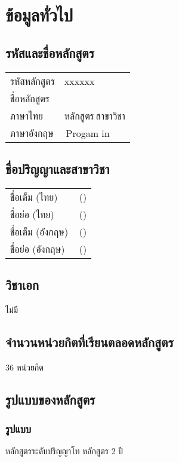 \cleardoublepage
\setcounter{page}{1}
\pagestyle{headings}
\chapter{ข้อมูลทั่วไป}

\section{รหัสและชื่อหลักสูตร}

\begin{tabular}{p{}p{}}
	รหัสหลักสูตร & xxxxxx\\
	ชื่อหลักสูตร & \\
	ภาษาไทย & หลักสูตร\thdegree\,สาขาวิชา\thdegreebranch \\
	ภาษาอังกฤษ & \engdegree\,Progam in \engdegreebranch
\end{tabular}

\section{ชื่อปริญญาและสาขาวิชา}

\begin{tabular}{p{}p{}}
	ชื่อเต็ม (ไทย) & \thdegree\,(\thdegreebranch)\\
	ชื่อย่อ (ไทย) & \thshortdegree\,(\thdegreebranch)\\
	ชื่อเต็ม (อังกฤษ) & \engdegree\,(\engdegreebranch)\\
	ชื่อย่อ (อังกฤษ) & \engshortdegree\,(\engdegreebranch)\\
\end{tabular}

\section{วิชาเอก}
ไม่มี

\section{จำนวนหน่วยกิตที่เรียนตลอดหลักสูตร}
36 หน่วยกิต

\section{รูปแบบของหลักสูตร}

\subsection{รูปแบบ}
หลักสูตรระดับปริญญาโท หลักสูตร 2 ปี

